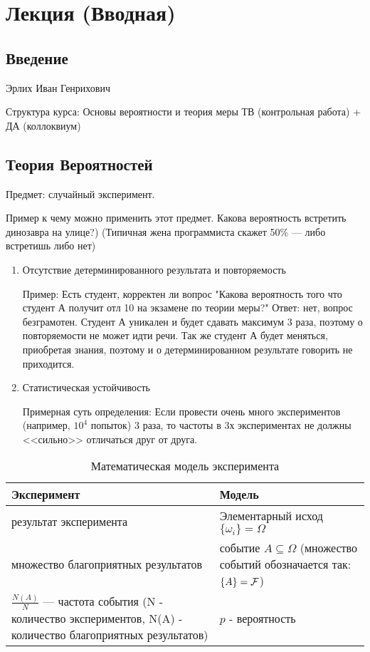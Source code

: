 \newpage
\section{Лекция (Вводная)}
\subsection{Введение}
Эрлих  Иван Генрихович

Структура курса:
Основы вероятности и теория меры
ТВ (контрольная работа) + ДА (коллоквиум)

\subsection{Теория Вероятностей}

Предмет: случайный эксперимент.

Пример к чему можно применить этот предмет. Какова вероятность встретить динозавра на улице?) (Типичная жена программиста скажет 50\% --- либо встретишь либо нет)

\begin{enumerate}
	\item Отсутствие детерминированного результата и повторяемость
	
	Пример: Есть студент, корректен ли вопрос "Какова вероятность того что студент А получит отл 10 на экзамене по теории меры?" 
	Ответ: нет, вопрос безграмотен. Студент А уникален и будет сдавать максимум 3 раза, поэтому о повторяемости не может идти речи. Так же студент А будет меняться, приобретая знания, поэтому и о детерминированном результате говорить не приходится.
	
	\item Статистическая устойчивость
	
	Примерная суть определения:
	Если провести очень много экспериментов (например, $10^4$ попыток) 3 раза, то частоты в 3х экспериментах не должны <<сильно>> отличаться друг от друга. 
\end{enumerate}



\begin{table}[!ht]
	\caption{Математическая модель эксперимента}
	\begin{tabular}{p{}|p{}}
		Эксперимент & Модель \\
		\hline
		результат эксперимента & Элементарный исход $ \{\omega_i\} = \Omega $  \\
		множество благоприятных результатов & событие $A \subseteq \Omega$ 
		(множество событий обозначается так: $\{A\} = \mathcal{F}$) \\
		$\frac{N(A)}{N}$ --- частота события (N - количество экспериментов, N(A) - количество благоприятных результатов) & $p$ - вероятность \\
		\hline
	\end{tabular}
\end{table}

